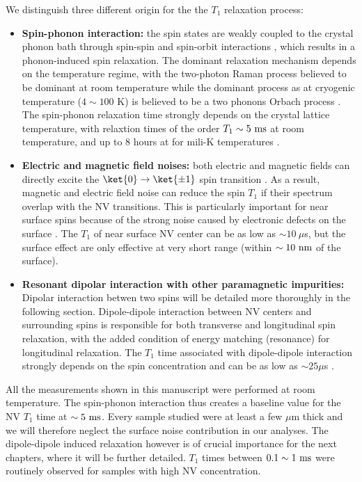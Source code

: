 \documentclass[a4paper,11pt]{report}
\begin{document}
We distinguish three different origin for the the $T_1$ relaxation process:
\begin{itemize}
\item \textbf{Spin-phonon interaction:} the spin states are weakly coupled to the crystal phonon bath through spin-spin and spin-orbit interactions \citep{norambuena2018spin}, which results in a phonon-induced spin relaxation. The dominant relaxation mechanism depends on the  temperature regime, with the two-photon Raman process believed to be dominant at room temperature \citep{takahashi2008quenching, jarmola2012temperature} while the dominant process as at cryogenic temperature ($4\sim100$ K) is believed to be a two phonons Orbach process \citep{redman1991spin, norambuena2018spin}. The spin-phonon relaxation time strongly depends on the crystal lattice temperature, with relaxtion times of the order $T_1 \sim 5\ \rm ms$ at room temperature, and up to 8 hours at for mili-K temperatures \citep{astner2018solid}.

\item \textbf{Electric and magnetic field noises:} both electric and magnetic fields can directly excite the $\ket{0} \to \ket{\pm 1}$ spin transition \citep{udvarhelyi2018spin}. As a result, magnetic and electric field noise can reduce the spin $T_1$ if their spectrum overlap with the NV transitions. This is particularly important for near surface spins because of the strong noise caused by electronic defects on the surface \citep{sangtawesin2019origins}. The $T_1$ of near surface NV center can be as low as $\sim 10\ \mu$s, but the surface effect are only effective at very short range (within $\sim 10\ \rm nm$ of the surface).

\item \textbf{Resonant dipolar interaction with other paramagnetic impurities:} Dipolar interaction betwen two spins will be detailed more thoroughly in the following section. Dipole-dipole interaction between NV centers and surrounding spins is responsible for both transverse and longitudinal spin relaxation, with the added condition of energy matching (resonance) for longitudinal relaxation. The $T_1$ time associated with dipole-dipole interaction strongly depends on the spin concentration and can be as low as $\sim 25 \mu$s \citep{hall2016detection}.
\end{itemize}

All the measurements shown in this manuscript were performed at room temperature. The spin-phonon interaction thus creates a baseline value for the NV $T_1$ time at $\sim 5\ \rm ms$. Every sample studied were at least a few $\mu$m thick and we will therefore neglect the surface noise contribution in our analyses. The dipole-dipole induced relaxation however is of crucial importance for the next chapters, where it will be further detailed. $T_1$ times between $0.1 \sim 1\ \rm ms$ were routinely observed for samples with high NV concentration.
\end{document}
